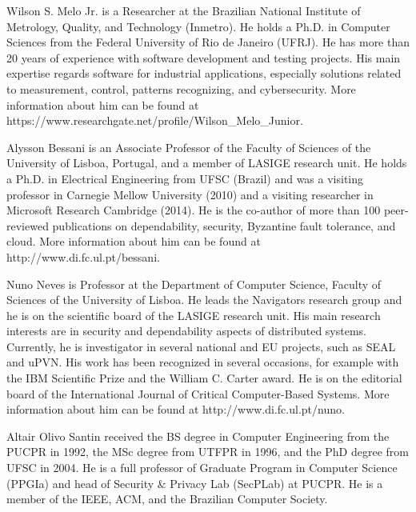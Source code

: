 \documentclass[journal]{IEEEtran}
\begin{document}

\begin{IEEEbiographynophoto}{Wilson S. Melo Jr.}
is a Researcher at the Brazilian National Institute of Metrology, Quality, and Technology (Inmetro).
He holds a Ph.D. in Computer Sciences from the Federal University of Rio de Janeiro (UFRJ).
He has more than 20 years of experience with software development and testing projects.
His main expertise regards software for industrial applications, especially solutions related to measurement, control, patterns recognizing, and cybersecurity.
More information about him can be found at https://www.researchgate.net/profile/Wilson\_Melo\_Junior.
\end{IEEEbiographynophoto}

\begin{IEEEbiographynophoto}{Alysson Bessani}
 is an Associate Professor of the Faculty of Sciences of the University of Lisboa, Portugal, and a member of LASIGE research unit. He holds a Ph.D. in Electrical Engineering from UFSC (Brazil) and was a visiting professor in Carnegie Mellow University (2010) and a visiting researcher in Microsoft Research Cambridge (2014). He is the co-author of more than 100 peer-reviewed publications on dependability, security, Byzantine fault tolerance, and cloud. More information about him can be found at http://www.di.fc.ul.pt/\texttildelow{}bessani.
\end{IEEEbiographynophoto}

\begin{IEEEbiographynophoto}{Nuno Neves}
is Professor at the Department of Computer Science, Faculty of Sciences of the University of Lisboa. He leads the Navigators research group and he is on the scientific board of the LASIGE research unit. His main research interests are in security and dependability aspects of distributed systems. Currently, he is investigator in several national and EU projects, such as SEAL and uPVN. His work has been recognized in several occasions, for example with the IBM Scientific Prize and the William C. Carter award. He is on the editorial board of the International Journal of Critical Computer-Based Systems. More information about him can be found at http://www.di.fc.ul.pt/\texttildelow{}nuno.
\end{IEEEbiographynophoto}

\begin{IEEEbiographynophoto}{Altair Olivo Santin}
received the BS degree in Computer Engineering from the PUCPR in 1992, the MSc degree from UTFPR in 1996, and the PhD degree from UFSC in 2004. 
He is a full professor of Graduate Program in Computer Science (PPGIa) and head of Security \& Privacy Lab (SecPLab) at PUCPR. 
He is a member of the IEEE, ACM, and the Brazilian Computer Society.
\end{IEEEbiographynophoto}
\end{document}
